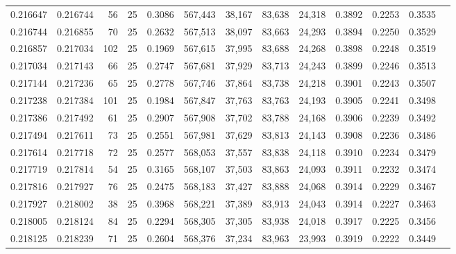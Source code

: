 \begin{tabular}{rrrrrrrrrrrrr}
0.216647 & 0.216744 &    56 &  25 &                                     0.3086 & 567,443 &  38,167 &  83,638 &  24,318 & 0.3892 & 0.2253 & 0.3535 \\
0.216744 & 0.216855 &    70 &  25 &                                     0.2632 & 567,513 &  38,097 &  83,663 &  24,293 & 0.3894 & 0.2250 & 0.3529 \\
0.216857 & 0.217034 &   102 &  25 &                                     0.1969 & 567,615 &  37,995 &  83,688 &  24,268 & 0.3898 & 0.2248 & 0.3519 \\
0.217034 & 0.217143 &    66 &  25 &                                     0.2747 & 567,681 &  37,929 &  83,713 &  24,243 & 0.3899 & 0.2246 & 0.3513 \\
0.217144 & 0.217236 &    65 &  25 &                                     0.2778 & 567,746 &  37,864 &  83,738 &  24,218 & 0.3901 & 0.2243 & 0.3507 \\
0.217238 & 0.217384 &   101 &  25 &                                     0.1984 & 567,847 &  37,763 &  83,763 &  24,193 & 0.3905 & 0.2241 & 0.3498 \\
0.217386 & 0.217492 &    61 &  25 &                                     0.2907 & 567,908 &  37,702 &  83,788 &  24,168 & 0.3906 & 0.2239 & 0.3492 \\
0.217494 & 0.217611 &    73 &  25 &                                     0.2551 & 567,981 &  37,629 &  83,813 &  24,143 & 0.3908 & 0.2236 & 0.3486 \\
0.217614 & 0.217718 &    72 &  25 &                                     0.2577 & 568,053 &  37,557 &  83,838 &  24,118 & 0.3910 & 0.2234 & 0.3479 \\
0.217719 & 0.217814 &    54 &  25 &                                     0.3165 & 568,107 &  37,503 &  83,863 &  24,093 & 0.3911 & 0.2232 & 0.3474 \\
0.217816 & 0.217927 &    76 &  25 &                                     0.2475 & 568,183 &  37,427 &  83,888 &  24,068 & 0.3914 & 0.2229 & 0.3467 \\
0.217927 & 0.218002 &    38 &  25 &                                     0.3968 & 568,221 &  37,389 &  83,913 &  24,043 & 0.3914 & 0.2227 & 0.3463 \\
0.218005 & 0.218124 &    84 &  25 &                                     0.2294 & 568,305 &  37,305 &  83,938 &  24,018 & 0.3917 & 0.2225 & 0.3456 \\
0.218125 & 0.218239 &    71 &  25 &                                     0.2604 & 568,376 &  37,234 &  83,963 &  23,993 & 0.3919 & 0.2222 & 0.3449 \\

\end{tabular}
